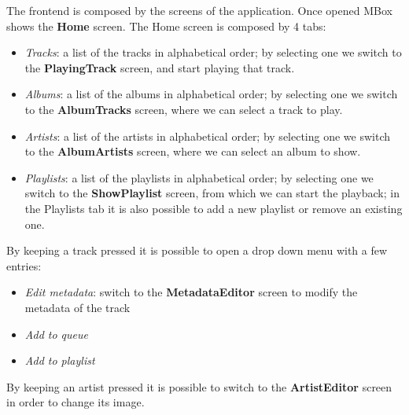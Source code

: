 \documentclass{article}
\begin{document}
The frontend is composed by the screens of the application. Once opened MBox
shows the \textbf{Home} screen. The Home screen is composed by 4 tabs:
\begin{itemize}
    \item \textit{Tracks}: a list of the tracks in alphabetical order; by
        selecting one we switch to the \textbf{PlayingTrack} screen, and start
        playing that track.
    \item \textit{Albums}: a list of the albums in alphabetical order; by
        selecting one we switch to the \textbf{AlbumTracks} screen, where we can
        select a track to play. 
    \item \textit{Artists}: a list of the artists in alphabetical order; by
        selecting one we switch to the \textbf{AlbumArtists} screen, where  we
        can select an album to show.
    \item \textit{Playlists}: a list of the playlists in alphabetical order; by
        selecting one we switch to the \textbf{ShowPlaylist} screen, from which
        we can start the playback; in the Playlists tab it is also possible to
        add a new playlist or remove an existing one.
\end{itemize}

By keeping a track pressed it is possible to open a drop down menu with a few
entries:
\begin{itemize}
    \item \textit{Edit metadata}: switch to the \textbf{MetadataEditor} screen
        to modify the metadata of the track
    \item \textit{Add to queue}
    \item \textit{Add to playlist}
\end{itemize}

By keeping an artist pressed it is possible to switch to the
\textbf{ArtistEditor} screen in order to change its image.
\end{document}
